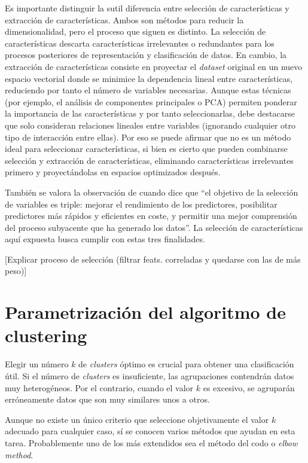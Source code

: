 Es importante distinguir la sutil diferencia entre selección de características y extracción de características.
Ambos son métodos para reducir la dimensionalidad, pero el proceso que siguen es distinto.
La selección de características descarta características irrelevantes o redundantes para los procesos posteriores de representación y clasificación de datos.
En cambio, la extracción de características consiste en proyectar el \emph{dataset} original en un nuevo espacio vectorial
donde se minimice la dependencia lineal entre características, reduciendo por tanto el número de variables necesarias.
Aunque estas técnicas (por ejemplo, el análisis de componentes principales o PCA) permiten ponderar la importancia de las características y por tanto seleccionarlas,
debe destacarse que solo consideran relaciones lineales entre variables (ignorando cualquier otro tipo de interacción entre ellas).
Por eso se puede afirmar que no es un método ideal para seleccionar características, si bien es cierto
que pueden combinarse selección y extracción de características, eliminando características irrelevantes primero y proyectándolas en espacios optimizados después.

También se valora la observación de \cite{Guyon_2003} cuando dice que ``el objetivo de la selección de variables es triple: mejorar el rendimiento de los predictores, posibilitar predictores más rápidos y eficientes en coste, y permitir una mejor comprensión del proceso subyacente que ha generado los datos''.
La selección de características aquí expuesta busca cumplir con estas tres finalidades.

[Explicar proceso de selección (filtrar feats. correladas y quedarse con las de más peso)]

\section{Parametrización del algoritmo de clustering}\label{sec:paramclustering}

Elegir un número $k$ de \emph{clusters} óptimo es crucial para obtener una clasificación útil.
Si el número de \emph{clusters} es insuficiente, las agrupaciones contendrán datos muy heterogéneos.
Por el contrario, cuando el valor $k$ es excesivo, se agruparán erróneamente datos que son muy similares unos a otros.

Aunque no existe un único criterio que seleccione objetivamente el valor $k$ adecuado para cualquier caso, sí se conocen varios métodos que ayudan en esta tarea.
Probablemente uno de los más extendidos sea el método del codo o \emph{elbow method}.

